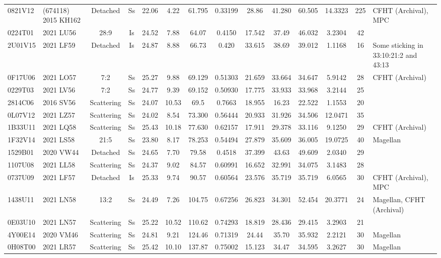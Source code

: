 \begin{longrotatetable}
\begin{longtable}{ll|ccccccccccc | l}
0821V12 & (674118) 2015 KH162 & Detached & Ss & 22.06 & 4.22 & 61.795 & 0.33199 & 28.86 & 41.280 & 60.505 & 14.3323 & 225 & CFHT (Archival), MPC  \\ 
0224T01 & 2021 LU56 & 28:9 & Is & 24.52 & 7.88 & 64.07 & 0.4150 & 17.542 & 37.49 & 46.032 & 3.2304 & 42 & \\ 
2U01V15 & 2021 LF59 & Detached & Is & 24.87 & 8.88 & 66.73 & 0.420 & 33.615 & 38.69 & 39.012 & 1.1168 & 16 & Some sticking in 33:10:21:2 and 43:13  \\ 
0F17U06 & 2021 LO57 & 7:2 & Ss & 25.27 & 9.88 & 69.129 & 0.51303 & 21.659 & 33.664 & 34.647 & 5.9142 & 28 & CFHT (Archival)  \\ 
0229T03 & 2021 LV56 & 7:2 & Ss & 24.77 & 9.39 & 69.152 & 0.50930 & 17.775 & 33.933 & 33.968 & 3.2144 & 25 & \\ 
2814C06 & 2016 SV56 & Scattering & Ss & 24.07 & 10.53 & 69.5 & 0.7663 & 18.955 & 16.23 & 22.522 & 1.1553 & 20 & \\ 
0L07V12 & 2021 LZ57 & Scattering & Ss & 24.02 & 8.54 & 73.300 & 0.56444 & 20.933 & 31.926 & 34.506 & 12.0471 & 35 & \\ 
1B33U11 & 2021 LQ58 & Scattering & Ss & 25.43 & 10.18 & 77.630 & 0.62157 & 17.911 & 29.378 & 33.116 & 9.1250 & 29 & CFHT (Archival)  \\ 
1F32V14 & 2021 LS58 & 21:5 & Ss & 23.80 & 8.17 & 78.253 & 0.54494 & 27.879 & 35.609 & 36.005 & 19.0725 & 40 & Magellan  \\ 
1529B01 & 2020 VW44 & Detached & Ss & 24.65 & 7.70 & 79.58 & 0.4518 & 37.399 & 43.63 & 49.609 & 2.0340 & 29 & \\ 
1107U08 & 2021 LL58 & Scattering & Ss & 24.37 & 9.02 & 84.57 & 0.60991 & 16.652 & 32.991 & 34.075 & 3.1483 & 28 & \\ 
0737U09 & 2021 LF57 & Detached & Is & 25.33 & 9.74 & 90.57 & 0.60564 & 23.576 & 35.719 & 35.719 & 6.0565 & 30 & CFHT (Archival), MPC  \\ 
1438U11 & 2021 LN58 & 13:2 & Ss & 24.49 & 7.26 & 104.75 & 0.67256 & 26.823 & 34.301 & 52.454 & 20.3771 & 24 & Magellan, CFHT (Archival)  \\ 
0E03U10 & 2021 LN57 & Scattering & Ss & 25.22 & 10.52 & 110.62 & 0.74293 & 18.819 & 28.436 & 29.415 & 3.2903 & 21 & \\ 
4Y00E14 & 2020 VM46 & Scattering & Ss & 24.81 & 9.21 & 124.46 & 0.71319 & 24.44 & 35.70 & 35.932 & 2.2121 & 30 & Magellan  \\ 
0H08T00 & 2021 LR57 & Scattering & Ss & 25.42 & 10.10 & 137.87 & 0.75002 & 15.123 & 34.47 & 34.595 & 3.2627 & 30 & Magellan  \\ 

\end{longtable}
\end{longrotatetable}
